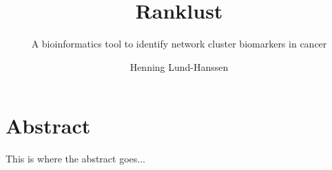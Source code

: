 \documentclass[UKenglish]{ifimaster}
\title{Ranklust}
\subtitle{A bioinformatics tool to identify network cluster biomarkers in
cancer}
\author{Henning Lund-Hanssen}
\begin{document}
\setlength{\parskip}{12pt}
\setlength{\parindent}{12pt}

\ififorside{}
\frontmatter{}
\maketitle{}

\chapter*{Abstract}
This is where the abstract goes...

\tableofcontents{}
\listoffigures{}
\listoftables{}

\mainmatter{}









\backmatter{}
\printbibliography
\end{document}
